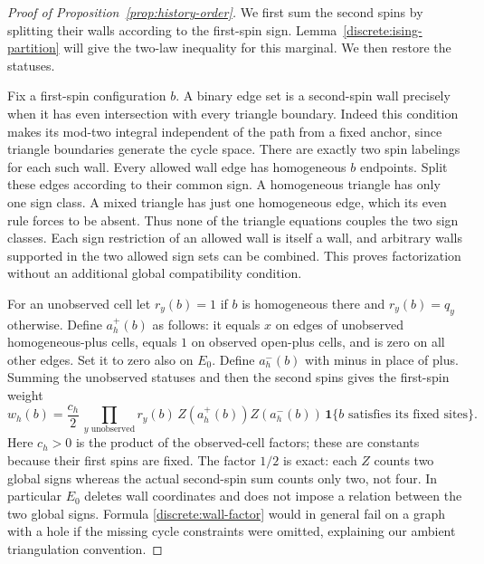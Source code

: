 \documentclass[11pt]{article}
\theoremstyle{definition}
\theoremstyle{remark}
\numberwithin{equation}{section}
\begin{document}
\begin{proof}[Proof of Proposition~\ref{prop:history-order}]
We first sum the second spins by splitting their walls according to the
first-spin sign.  Lemma~\ref{discrete:ising-partition} will give the
two-law inequality for this marginal.  We then restore the statuses.

Fix a first-spin configuration $b$. A binary edge set is a second-spin
wall precisely when it has even intersection with every triangle boundary.
Indeed this condition makes its mod-two integral independent of the path
from a fixed anchor, since triangle boundaries generate the cycle space.
There are exactly two spin labelings for each such wall. Every allowed wall
edge has homogeneous $b$ endpoints. Split these edges according to their
common sign. A homogeneous triangle has only one sign class. A mixed
triangle has just one homogeneous edge, which its even rule forces to be
absent. Thus none of the triangle equations couples the two sign classes.
Each sign restriction of an allowed wall is itself a wall, and arbitrary
walls supported in the two allowed sign sets can be combined. This proves
factorization without an additional global compatibility condition.

For an unobserved cell let
$r_y(b)=1$ if $b$ is homogeneous there and $r_y(b)=q_y$ otherwise.
Define $a_h^+(b)$ as follows: it equals $x$ on edges of unobserved
homogeneous-plus cells, equals $1$ on observed open-plus cells, and is zero
on all other edges. Set it to zero also on $E_0$. Define $a_h^-(b)$ with
minus in place of plus. Summing the unobserved statuses and then the second
spins gives the first-spin weight
\begin{equation}\label{discrete:wall-factor}
 w_h(b)=\frac{c_h}{2}\,
   \prod_{y\text{ unobserved}}r_y(b)\,
   Z(a_h^+(b))Z(a_h^-(b))\,
   \mathbf 1\{b\text{ satisfies its fixed sites}\}.
\end{equation}
Here $c_h>0$ is the product of the observed-cell factors; these are
constants because their first spins are fixed. The factor $1/2$ is exact:
each $Z$ counts two global signs whereas the actual second-spin sum counts
only two, not four. In particular $E_0$ deletes wall coordinates and does
not impose a relation between the two global signs. Formula
\eqref{discrete:wall-factor} would in general fail on a graph with a hole
if the missing cycle constraints were omitted, explaining our ambient
triangulation convention.


\end{proof}
\end{document}
